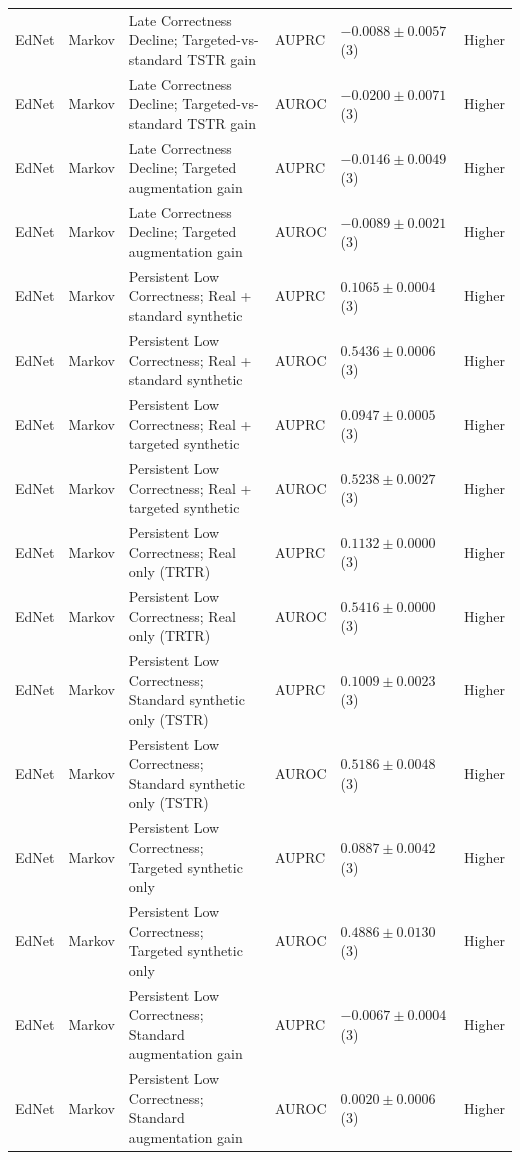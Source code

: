 \begin{longtable}{@{}p{2.25cm}p{2.05cm}p{4.7cm}p{5.0cm}p{2.6cm}p{1.25cm}@{}}
EdNet & Markov & Late Correctness Decline; Targeted-vs-standard TSTR gain & AUPRC & $-0.0088 \mathbin{\pm} 0.0057$ (3) & Higher \\
EdNet & Markov & Late Correctness Decline; Targeted-vs-standard TSTR gain & AUROC & $-0.0200 \mathbin{\pm} 0.0071$ (3) & Higher \\
EdNet & Markov & Late Correctness Decline; Targeted augmentation gain & AUPRC & $-0.0146 \mathbin{\pm} 0.0049$ (3) & Higher \\
EdNet & Markov & Late Correctness Decline; Targeted augmentation gain & AUROC & $-0.0089 \mathbin{\pm} 0.0021$ (3) & Higher \\
EdNet & Markov & Persistent Low Correctness; Real + standard synthetic & AUPRC & $0.1065 \mathbin{\pm} 0.0004$ (3) & Higher \\
EdNet & Markov & Persistent Low Correctness; Real + standard synthetic & AUROC & $0.5436 \mathbin{\pm} 0.0006$ (3) & Higher \\
EdNet & Markov & Persistent Low Correctness; Real + targeted synthetic & AUPRC & $0.0947 \mathbin{\pm} 0.0005$ (3) & Higher \\
EdNet & Markov & Persistent Low Correctness; Real + targeted synthetic & AUROC & $0.5238 \mathbin{\pm} 0.0027$ (3) & Higher \\
EdNet & Markov & Persistent Low Correctness; Real only (TRTR) & AUPRC & $0.1132 \mathbin{\pm} 0.0000$ (3) & Higher \\
EdNet & Markov & Persistent Low Correctness; Real only (TRTR) & AUROC & $0.5416 \mathbin{\pm} 0.0000$ (3) & Higher \\
EdNet & Markov & Persistent Low Correctness; Standard synthetic only (TSTR) & AUPRC & $0.1009 \mathbin{\pm} 0.0023$ (3) & Higher \\
EdNet & Markov & Persistent Low Correctness; Standard synthetic only (TSTR) & AUROC & $0.5186 \mathbin{\pm} 0.0048$ (3) & Higher \\
EdNet & Markov & Persistent Low Correctness; Targeted synthetic only & AUPRC & $0.0887 \mathbin{\pm} 0.0042$ (3) & Higher \\
EdNet & Markov & Persistent Low Correctness; Targeted synthetic only & AUROC & $0.4886 \mathbin{\pm} 0.0130$ (3) & Higher \\
EdNet & Markov & Persistent Low Correctness; Standard augmentation gain & AUPRC & $-0.0067 \mathbin{\pm} 0.0004$ (3) & Higher \\
EdNet & Markov & Persistent Low Correctness; Standard augmentation gain & AUROC & $0.0020 \mathbin{\pm} 0.0006$ (3) & Higher \\

\end{longtable}
